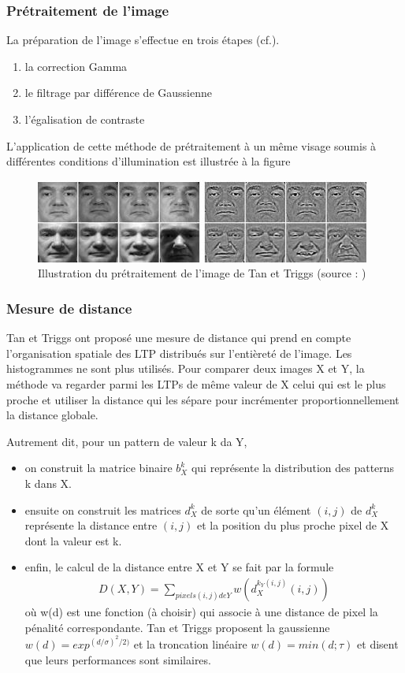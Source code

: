 \subsubsection*{Prétraitement de l'image}
La préparation de l'image s'effectue en trois étapes (cf.\cite{TAN}). 
\begin{enumerate}
	\item la correction Gamma
	\item le filtrage par différence de Gaussienne
	\item l'égalisation de contraste
\end{enumerate}
L'application de cette méthode de prétraitement à un même visage soumis à différentes conditions d'illumination
est illustrée à la figure 
\begin{figure}[htbp]
	\centering
		\includegraphics{pretraitement.JPG}
	\caption[Illustration du prétraitement de l'image de Tan et Triggs]{Illustration du prétraitement de l'image de Tan et Triggs (source : \cite{TAN})}
	\label{fig:pretraitement}
\end{figure}

\subsubsection*{Mesure de distance}
Tan et Triggs ont proposé une mesure de distance qui prend en compte l'organisation spatiale des LTP distribués sur l'entièreté de l'image. Les histogrammes ne sont plus utilisés. Pour comparer deux images X et Y, la méthode va regarder parmi les LTPs de même valeur de X celui qui est le plus proche et utiliser la distance qui les sépare pour incrémenter proportionnellement la distance globale. 

Autrement dit, pour un pattern de valeur k da Y, 
\begin{itemize}
	\item[\textbullet] on construit la matrice binaire $b^k_X$ qui représente la distribution des patterns k dans X.   
	\item[\textbullet] ensuite on construit les matrices $d^k_X$ de sorte qu'un élément $(i,j)$ de $d^k_X$ représente la distance entre $(i,j)$ et la position du plus proche pixel de X dont la valeur est k.
	\item[\textbullet] enfin, le calcul de la distance entre X et Y se fait par la formule
	\begin{eqnarray}
D(X,Y)=\sum_{pixels(i,j) de Y}{w(d_{X}^{k_Y(i,j)}{(i,j)})}
\label{eq20}
\end{eqnarray}
où w(d) est une fonction (à choisir) qui associe à une distance de pixel la pénalité correspondante. Tan et Triggs \cite{TAN} proposent la gaussienne $w(d)=exp^{(d/\sigma)^2/2)}$
et la troncation linéaire $w(d) = min(d; \tau)$ et disent que leurs performances sont similaires.
\end{itemize}

